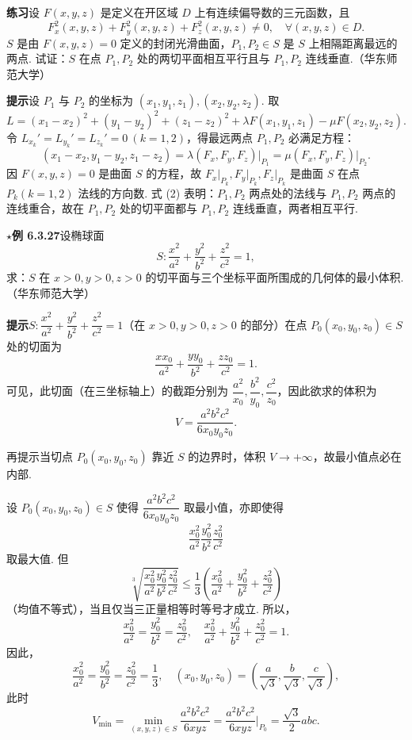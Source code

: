 \documentclass[UTF8,12pt,a4paper,fontset=fandol]{ctexart}
\begin{document}
\noindent\textbf{练习}\quad 设 $F(x,y,z)$ 是定义在开区域 $D$ 上有连续偏导数的三元函数，且
\[
  F_x^2(x,y,z)+F_y^2(x,y,z)+F_z^2(x,y,z)\ne0,\quad
  \forall(x,y,z)\in D. \tag{1}
\]
$S$ 是由 $F(x,y,z)=0$ 定义的封闭光滑曲面，$P_1,P_2\in S$ 是 $S$ 上相隔距离最远的两点. 试证：$S$ 在点 $P_1,P_2$ 处的两切平面相互平行且与 $P_1,P_2$ 连线垂直.（华东师范大学）

\noindent\textbf{提示}\quad 设 $P_1$ 与 $P_2$ 的坐标为 $(x_1,y_1,z_1),(x_2,y_2,z_2)$. 取
\[
  L=(x_1-x_2)^2+(y_1-y_2)^2+(z_1-z_2)^2
  +\lambda F(x_1,y_1,z_1)-\mu F(x_2,y_2,z_2).
\]
令 $L_{x_k}'=L_{y_k}'=L_{z_k}'=0\ (k=1,2)$，得最远两点 $P_1,P_2$ 必满足方程：
\[
  (x_1-x_2,y_1-y_2,z_1-z_2)
  =\lambda(F_x,F_y,F_z)\big|_{P_1}
  =\mu(F_x,F_y,F_z)\big|_{P_2}. \tag{2}
\]
因 $F(x,y,z)=0$ 是曲面 $S$ 的方程，故 $F_x\big|_{P_k},F_y\big|_{P_k},F_z\big|_{P_k}$ 是曲面 $S$ 在点 $P_k(k=1,2)$ 法线的方向数. 式 (2) 表明：$P_1,P_2$ 两点处的法线与 $P_1,P_2$ 两点的连线重合，故在 $P_1,P_2$ 处的切平面都与 $P_1,P_2$ 连线垂直，两者相互平行.

\noindent\textbf{\ensuremath{\star}例 6.3.27}\quad 设椭球面
\[
  S:\frac{x^2}{a^2}+\frac{y^2}{b^2}+\frac{z^2}{c^2}=1,
\]
求：$S$ 在 $x>0,y>0,z>0$ 的切平面与三个坐标平面所围成的几何体的最小体积.（华东师范大学）

\noindent\textbf{提示}\quad $S:\dfrac{x^2}{a^2}+\dfrac{y^2}{b^2}+\dfrac{z^2}{c^2}=1$（在 $x>0,y>0,z>0$ 的部分）在点 $P_0(x_0,y_0,z_0)\in S$ 处的切面为
\[
  \frac{xx_0}{a^2}+\frac{yy_0}{b^2}+\frac{zz_0}{c^2}=1.
\]
可见，此切面（在三坐标轴上）的截距分别为 $\dfrac{a^2}{x_0},\dfrac{b^2}{y_0},\dfrac{c^2}{z_0}$，因此欲求的体积为
\[
  V=\frac{a^2b^2c^2}{6x_0y_0z_0}.
\]

再提示\quad 当切点 $P_0(x_0,y_0,z_0)$ 靠近 $S$ 的边界时，体积 $V\to+\infty$，故最小值点必在内部.

设 $P_0(x_0,y_0,z_0)\in S$ 使得 $\dfrac{a^2b^2c^2}{6x_0y_0z_0}$ 取最小值，亦即使得
\[
  \frac{x_0^2}{a^2}\frac{y_0^2}{b^2}\frac{z_0^2}{c^2}
\]
取最大值. 但
\[
  \sqrt[3]{\frac{x_0^2}{a^2}\frac{y_0^2}{b^2}\frac{z_0^2}{c^2}}
  \le \frac13\left(\frac{x_0^2}{a^2}+\frac{y_0^2}{b^2}+\frac{z_0^2}{c^2}\right)
\]
（均值不等式），当且仅当三正量相等时等号才成立. 所以，
\[
  \frac{x_0^2}{a^2}=\frac{y_0^2}{b^2}=\frac{z_0^2}{c^2},
  \quad
  \frac{x_0^2}{a^2}+\frac{y_0^2}{b^2}+\frac{z_0^2}{c^2}=1.
\]
因此，
\[
  \frac{x_0^2}{a^2}=\frac{y_0^2}{b^2}=\frac{z_0^2}{c^2}=\frac13,
  \quad
  (x_0,y_0,z_0)=\left(\frac{a}{\sqrt3},\frac{b}{\sqrt3},\frac{c}{\sqrt3}\right),
\]
此时
\[
  V_{\min}=\min_{(x,y,z)\in S}\frac{a^2b^2c^2}{6xyz}
  =\frac{a^2b^2c^2}{6xyz}\bigg|_{P_0}
  =\frac{\sqrt3}{2}abc.
\]
\end{document}
